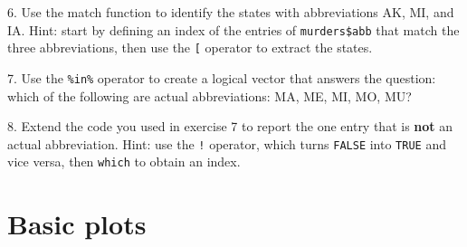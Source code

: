 \documentclass[
]{krantz}
\newenvironment{Shaded}{\begin{snugshade}}{\end{snugshade}}
\newcommand{\CommentTok}[1]{\textcolor[rgb]{0.37,0.37,0.37}{\textit{#1}}}
\newcommand{\DataTypeTok}[1]{\textcolor[rgb]{0.27,0.27,0.27}{#1}}
\newcommand{\KeywordTok}[1]{\textcolor[rgb]{0.27,0.27,0.27}{\textbf{#1}}}
\newcommand{\NormalTok}[1]{#1}
\newcommand{\OperatorTok}[1]{\textcolor[rgb]{0.43,0.43,0.43}{\textbf{#1}}}
\newcommand{\StringTok}[1]{\textcolor[rgb]{0.5,0.5,0.5}{#1}}
\begin{document}
6. Use the match function to identify the states with abbreviations AK, MI, and IA. Hint: start by defining an index of the entries of \texttt{murders\$abb} that match the three abbreviations, then use the \texttt{{[}} operator to extract the states.

\begin{Shaded}
\end{Shaded}

7. Use the \texttt{\%in\%} operator to create a logical vector that answers the question: which of the following are actual abbreviations: MA, ME, MI, MO, MU?

\begin{Shaded}
\end{Shaded}

8. Extend the code you used in exercise 7 to report the one entry that is \textbf{not} an actual abbreviation. Hint: use the \texttt{!} operator, which turns \texttt{FALSE} into \texttt{TRUE} and vice versa, then \texttt{which} to obtain an index.

\begin{Shaded}
\end{Shaded}

\hypertarget{basic-plots}{%
\section{Basic plots}\label{basic-plots}}
\end{document}
